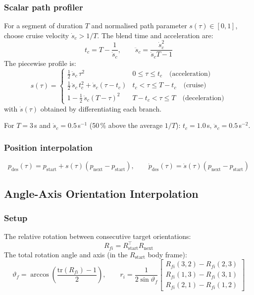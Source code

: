 \documentclass[11pt,a4paper]{article}
\begin{document}
\subsubsection*{Scalar path profiler}
For a segment of duration $T$ and normalised path parameter
$s(\tau)\in[0,1]$, choose cruise velocity $\dot{s}_c>1/T$. The blend time
and acceleration are:
\begin{equation}
  t_c = T - \frac{1}{\dot{s}_c},
  \qquad
  \ddot{s}_c = \frac{\dot{s}_c^2}{\dot{s}_c T - 1}
\end{equation}
The piecewise profile is:
\begin{equation}
  s(\tau)=
  \begin{cases}
    \tfrac{1}{2}\,\ddot{s}_c\,\tau^2 & 0\le\tau\le t_c \quad\text{(acceleration)}\\[4pt]
    \tfrac{1}{2}\,\ddot{s}_c\,t_c^2+\dot{s}_c(\tau-t_c)
      & t_c<\tau\le T-t_c \quad\text{(cruise)}\\[4pt]
    1-\tfrac{1}{2}\,\ddot{s}_c(T-\tau)^2 & T-t_c<\tau\le T \quad\text{(deceleration)}
  \end{cases}
\end{equation}
with $\dot{s}(\tau)$ obtained by differentiating each branch.

For $T=3$\,s and $\dot{s}_c=0.5$\,s$^{-1}$ (50\,\% above the average $1/T$):
$t_c=1.0$\,s, $\ddot{s}_c=0.5$\,s$^{-2}$.

\subsubsection*{Position interpolation}
\begin{equation}
  p_{\mathrm{des}}(\tau) = p_{\mathrm{start}} + s(\tau)(p_{\mathrm{next}}-p_{\mathrm{start}}),
  \qquad
  \dot{p}_{\mathrm{des}}(\tau) = \dot{s}(\tau)(p_{\mathrm{next}}-p_{\mathrm{start}})
\end{equation}

\subsection{Angle-Axis Orientation Interpolation}

\subsubsection*{Setup}
The relative rotation between consecutive target orientations:
\begin{equation}
  R_{fi} = R_{\mathrm{start}}^\top R_{\mathrm{next}}
\end{equation}
The total rotation angle and axis (in the $R_{\mathrm{start}}$ body frame):
\begin{equation}
  \vartheta_f = \arccos\!\left(\frac{\mathrm{tr}(R_{fi})-1}{2}\right),
  \qquad
  r_i = \frac{1}{2\sin\vartheta_f}
    \begin{bmatrix}R_{fi}(3,2)-R_{fi}(2,3)\\R_{fi}(1,3)-R_{fi}(3,1)\\R_{fi}(2,1)-R_{fi}(1,2)\end{bmatrix}
\end{equation}
\end{document}
